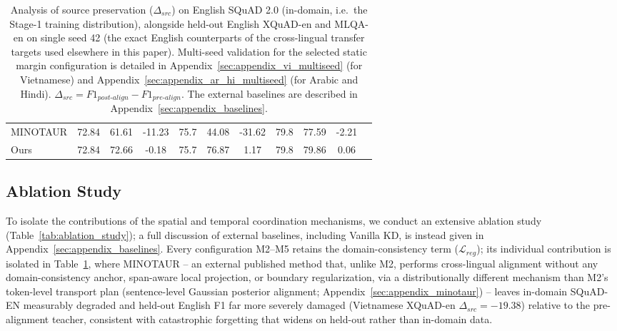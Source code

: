 \documentclass[11pt]{article}
\begin{document}
\begin{table}[t]
{\begin{tabular}{lcccccccccc}
MINOTAUR & 72.84 & 61.61 & -11.23 & 75.7 & 44.08 & -31.62 & 79.8 & 77.59 & -2.21 \\
Ours & 72.84 & 72.66 & -0.18 & 75.7 & 76.87 & 1.17 & 79.8 & 79.86 & 0.06 \\
\bottomrule
\end{tabular}
}
\caption{Analysis of source preservation ($\Delta_{src}$) on English SQuAD 2.0 (in-domain, i.e.\ the Stage-1 training distribution), alongside held-out English XQuAD-en and MLQA-en on single seed 42 (the exact English counterparts of the cross-lingual transfer targets used elsewhere in this paper). Multi-seed validation for the selected static margin configuration is detailed in Appendix~\ref{sec:appendix_vi_multiseed} (for Vietnamese) and Appendix~\ref{sec:appendix_ar_hi_multiseed} (for Arabic and Hindi). $\Delta_{src} = F1_{post\text{-}align} - F1_{pre\text{-}align}$. The external baselines are described in Appendix~\ref{sec:appendix_baselines}.}
\label{tab:source_preservation}
\end{table}

\subsection{Ablation Study}
\label{sec:ablation_study}
To isolate the contributions of the spatial and temporal coordination mechanisms, we conduct an extensive ablation study (Table~\ref{tab:ablation_study}); a full discussion of external baselines, including Vanilla KD, is instead given in Appendix~\ref{sec:appendix_baselines}. Every configuration M2--M5 retains the domain-consistency term ($\mathcal{L}_{reg}$); its individual contribution is isolated in Table~\ref{tab:source_preservation}, where MINOTAUR -- an external published method that, unlike M2, performs cross-lingual alignment without any domain-consistency anchor, span-aware local projection, or boundary regularization, via a distributionally different mechanism than M2's token-level transport plan (sentence-level Gaussian posterior alignment; Appendix~\ref{sec:appendix_minotaur}) -- leaves in-domain SQuAD-EN measurably degraded and held-out English F1 far more severely damaged (Vietnamese XQuAD-en $\Delta_{src}=-19.38$) relative to the pre-alignment teacher, consistent with catastrophic forgetting that widens on held-out rather than in-domain data.
\end{document}

